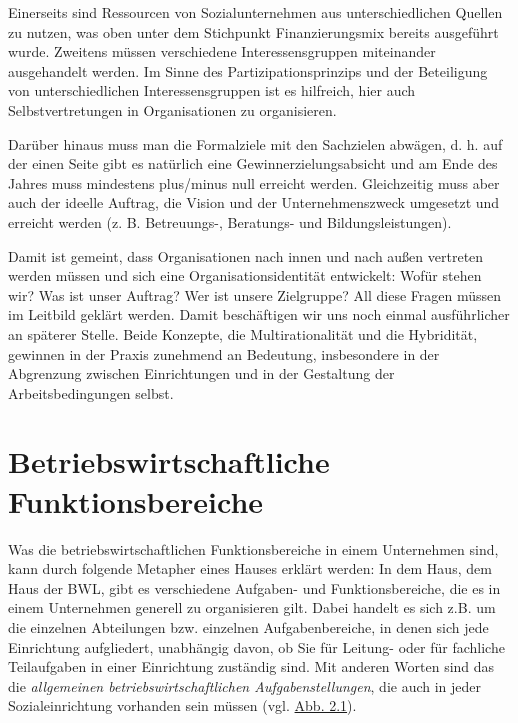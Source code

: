 \documentclass[
  letterpaper,
]{book}
\begin{document}
Einerseits sind Ressourcen von Sozialunternehmen aus unterschiedlichen
Quellen zu nutzen, was oben unter dem Stichpunkt Finanzierungsmix
bereits ausgeführt wurde. Zweitens müssen verschiedene
Interessensgruppen miteinander ausgehandelt werden. Im Sinne des
Partizipationsprinzips und der Beteiligung von unterschiedlichen
Interessensgruppen ist es hilfreich, hier auch Selbstvertretungen in
Organisationen zu organisieren.

Darüber hinaus muss man die Formalziele mit den Sachzielen abwägen, d.
h. auf der einen Seite gibt es natürlich eine Gewinnerzielungsabsicht
und am Ende des Jahres muss mindestens plus/minus null erreicht werden.
Gleichzeitig muss aber auch der ideelle Auftrag, die Vision und der
Unternehmenszweck umgesetzt und erreicht werden (z. B. Betreuungs-,
Beratungs- und Bildungsleistungen).

Damit ist gemeint, dass Organisationen nach innen und nach außen
vertreten werden müssen und sich eine Organisationsidentität entwickelt:
Wofür stehen wir? Was ist unser Auftrag? Wer ist unsere Zielgruppe? All
diese Fragen müssen im Leitbild geklärt werden. Damit beschäftigen wir
uns noch einmal ausführlicher an späterer Stelle. Beide Konzepte, die
Multirationalität und die Hybridität, gewinnen in der Praxis zunehmend
an Bedeutung, insbesondere in der Abgrenzung zwischen Einrichtungen und
in der Gestaltung der Arbeitsbedingungen selbst.

\chapter{Betriebswirtschaftliche
Funktionsbereiche}\label{funktionsbereiche}

Was die betriebswirtschaftlichen Funktionsbereiche in einem Unternehmen
sind, kann durch folgende Metapher eines Hauses erklärt werden: In dem
Haus, dem Haus der BWL, gibt es verschiedene Aufgaben- und
Funktionsbereiche, die es in einem Unternehmen generell zu organisieren
gilt. Dabei handelt es sich z.B. um die einzelnen Abteilungen bzw.
einzelnen Aufgabenbereiche, in denen sich jede Einrichtung aufgliedert,
unabhängig davon, ob Sie für Leitung- oder für fachliche Teilaufgaben in
einer Einrichtung zuständig sind. Mit anderen Worten sind das die
\emph{allgemeinen betriebswirtschaftlichen Aufgabenstellungen}, die auch
in jeder Sozialeinrichtung vorhanden sein müssen (vgl.
\hyperref[figure21]{Abb. 2.1}).
\end{document}
